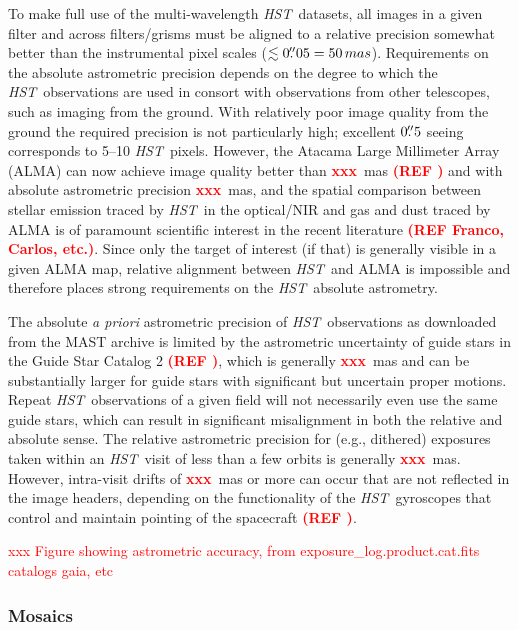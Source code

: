\documentclass[twocolumn]{aastex63}
\gdef\HST{\textit{HST}}
\newcommand\xxx{{\textcolor{red}{\bf xxx}}}
\newcommand\xref[1]{{\textcolor{red}{\bf (REF #1)}}}
\newcommand\XXX[1]{{\textcolor{red}{xxx #1}}}
\begin{document}
To make full use of the multi-wavelength \HST\ datasets, all images in a given filter and across filters/grisms must be aligned to a relative precision somewhat better than the instrumental pixel scales ($\lesssim 0\mbox{$.\!\!^{\prime\prime}$}05 = 50\,mas$).  Requirements on the absolute astrometric precision depends on the degree to which the \HST\ observations are used in consort with observations from other telescopes, such as imaging from the ground.  With relatively poor image quality from the ground the required precision is not particularly high; excellent $0\mbox{$.\!\!^{\prime\prime}$}5$ seeing corresponds to 5--10 \HST\ pixels.  However, the Atacama Large Millimeter Array (ALMA) can now achieve image quality better than \xxx\ mas \xref{} and with absolute astrometric precision \xxx\ mas, and the spatial comparison between stellar emission traced by \HST\ in the optical/NIR and gas and dust traced by ALMA is of paramount scientific interest in the recent literature \xref{Franco, Carlos, etc.}. Since only the target of interest (if that) is generally visible in a given ALMA map, relative alignment between \HST\ and ALMA is impossible and therefore places strong requirements on the \HST\ absolute astrometry.

The absolute \textit{a priori} astrometric precision of \HST\ observations as downloaded from the MAST archive is limited by the astrometric uncertainty of guide stars in the Guide Star Catalog 2 \xref{}, which is generally \xxx\ mas and can be substantially larger for guide stars with significant but uncertain proper motions.  Repeat \HST\ observations of a given field will not necessarily even use the same guide stars, which can result in significant misalignment in both the relative and absolute sense.  The relative astrometric precision for (e.g., dithered) exposures taken within an \HST\ visit of less than a few orbits is generally \xxx\ mas.  However, intra-visit drifts of \xxx\ mas or more can occur that are not reflected in the image headers, depending on the functionality of the \HST\ gyroscopes that control and maintain pointing of the spacecraft \xref{}.  

\XXX{Figure showing astrometric accuracy, from exposure\_log.product.cat.fits catalogs gaia, etc}

\subsubsection{Mosaics}
\label{s:mosaics}
\end{document}

